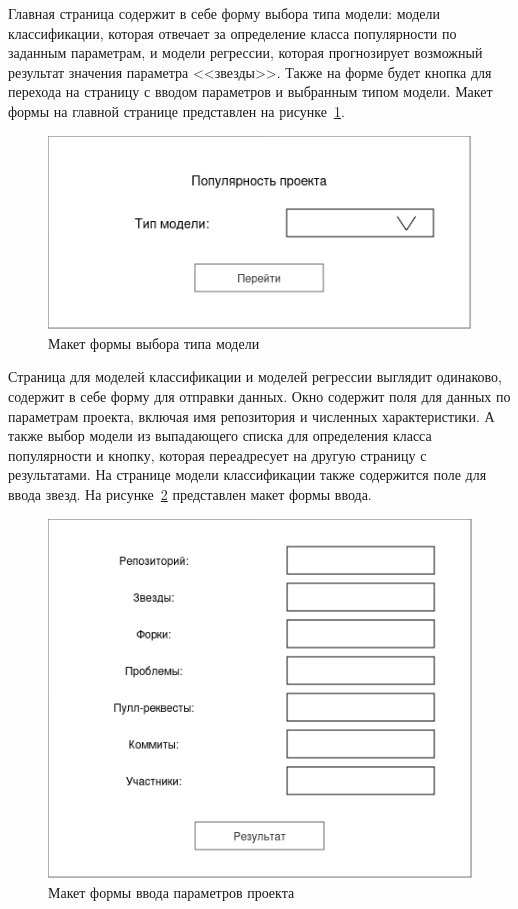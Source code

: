 Главная страница содержит в себе форму выбора типа модели: модели классификации, которая отвечает за определение класса популярности по заданным параметрам, и модели регрессии, которая прогнозирует возможный результат значения параметра <<звезды>>. Также на форме будет кнопка для перехода на страницу с вводом параметров и выбранным типом модели. Макет формы на главной странице представлен на рисунке~\ref{ris:main-form}.

\begin{figure}[h]
    \centering
    \includegraphics[width=0.7\linewidth]{pic/main-form.png}
    \vspace{0.5em}\caption{Макет формы выбора типа модели}
    \label{ris:main-form}
\end{figure}
\vspace{1em}

Страница для моделей классификации и моделей регрессии выглядит одинаково, содержит в себе форму для отправки данных. Окно содержит поля для данных по параметрам проекта, включая имя репозитория и численных характеристики. А также выбор модели из выпадающего списка для определения класса популярности и кнопку, которая переадресует на другую страницу с результатами. На странице модели классификации также содержится поле для ввода звезд. На рисунке~\ref{ris:form-input} представлен макет формы ввода.

\begin{figure}[h]
    \centering
    \includegraphics[width=0.8\linewidth]{pic/form-input.png}
    \vspace{0.5em}    \caption{Макет формы ввода параметров проекта}
    \label{ris:form-input}
\end{figure}
\vspace{1em}

